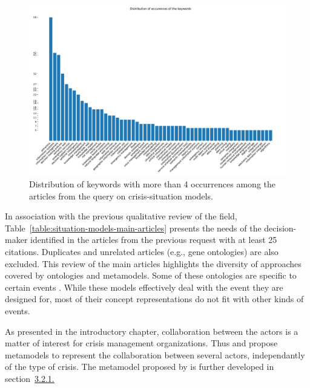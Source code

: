 \begin{figure}[htb]
    \includegraphics[width=\textwidth]{figures/chap-2/situation-models-bar.pdf}
    \caption{Distribution of keywords with more than 4 occurrences among the articles from the query on crisis-situation models.}
    \label{literature:situation-models-bar}
\end{figure}

In association with the previous qualitative review of the field, Table~\ref{table:situation-models-main-articles} presents the needs of the decision-maker identified in the articles from the previous request with at least 25 citations.
Duplicates and unrelated articles (e.g., gene ontologies) are also excluded.
This review of the main articles highlights the diversity of approaches covered by ontologies and metamodels.
Some of these ontologies are specific to certain events \parencite{xuModelingRepresentationEarthquake2014,qiuIntegratedFloodManagement2017,jungOntologydrivenSlopeModeling2015}.
While these models effectively deal with the event they are designed for, most of their concept representations do not fit with other kinds of events.

As presented in the introductory chapter, collaboration between the actors is a matter of interest for crisis management organizations.
Thus \textcite{benabenMetamodelItsOntology2008b} and \textcite{othmanDevelopmentValidationDisaster2014} propose metamodels to represent the collaboration between several actors, independantly of the type of crisis.
The metamodel proposed by \citeauthor{benabenMetamodelItsOntology2008b} is further developed in section~\hyperref[sec:crisismetamodel]{3.2.1.}

